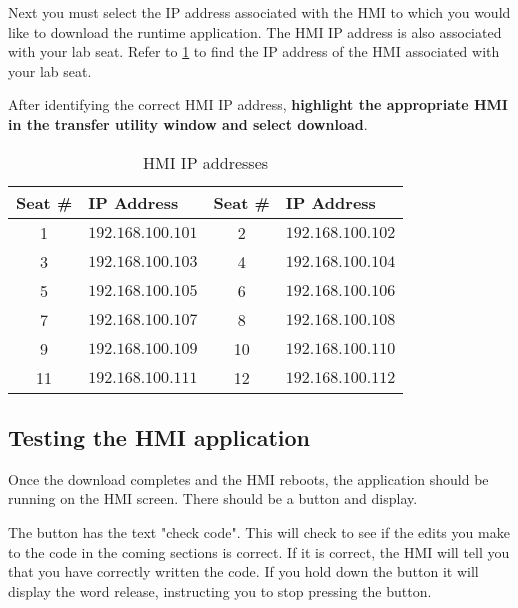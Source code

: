 Next you must select the IP address associated with the HMI to which you would like to download the runtime application. The HMI IP address is also associated with your lab seat. Refer to \tableautorefname \ref{Table:HMIIpAddresses} to find the IP address of the HMI associated with your lab seat. 

After identifying the correct HMI IP address, \textbf{highlight the appropriate HMI in the transfer utility window and select download}.


\begin{table}[h]
\centering
\caption{HMI IP addresses}
\label{Table:HMIIpAddresses}
\begin{tabular}{c l | c l}
\toprule
Seat \# & IP Address & Seat \# & IP Address\\
\midrule
1 & $192.168.100.101$ & 2 & $192.168.100.102$ \\
3 & $192.168.100.103$ & 4 & $192.168.100.104$ \\
5 & $192.168.100.105$ & 6 & $192.168.100.106$ \\
7 & $192.168.100.107$ & 8 & $192.168.100.108$ \\
9 & $192.168.100.109$ & 10 & $192.168.100.110$ \\
11 & $192.168.100.111$ & 12 & $192.168.100.112$ \\
\bottomrule
\end{tabular}
\end{table}

\subsection{Testing the HMI application}

Once the download completes and the HMI reboots, the application should be running on the HMI screen. There should be a button and display. 

The button has the text "check code". This will check to see if the edits you make to the code in the coming sections is correct. If it is correct, the HMI will tell you that you have correctly written the code. If you hold down the button it will display the word release, instructing you to stop pressing the button.


